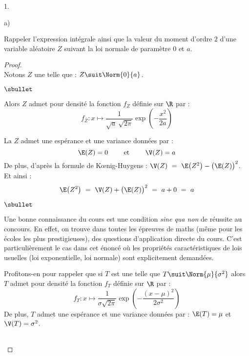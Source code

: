 \documentclass[11pt]{article}%
\begin{document}
\begin{noliste}{1.}
\begin{noliste}{a)}
  \item Rappeler l'expression intégrale ainsi que la valeur du moment
    d'ordre $2$ d'une variable aléatoire $Z$ suivant la loi normale de
    paramètre $0$ et $a$.

    \begin{proof}~\\%
      Notons $Z$ une \var telle que : $Z \suit \Norm{0}{a}$.
      \begin{noliste}{$\sbullet$}
      \item Alors $Z$ admet pour densité la fonction $f_Z$ définie sur
        $\R$ par : 
        \[
        f_Z : x \mapsto \dfrac{1}{\sqrt{a} \ \sqrt{2\pi}}
        \exp\left(-\dfrac{x^2}{2a} \right)
        \]

      \item La \var $Z$ admet une espérance et une variance données
        par :
        \[
        \E(Z) = 0 \qquad \text{ et } \qquad \V(Z) = a
        \]
        De plus, d'après la formule de K\oe{}nig-Huygens : $\V(Z) \ =
        \ \E\big( Z^2 \big) - \big( \E(Z) \big)^2$. Et ainsi :
        \[
        \E\big( Z^2 \big) \ = \ \V(Z) + \big( \E(Z) \big)^2 \ = \ a +
        0 \ = \ a
        \]
      \end{noliste}
    \begin{remarkL}{.97}%
      \begin{noliste}{$\sbullet$}
      \item Une bonne connaissance du cours est une condition {\it
          sine qua non} de réussite au concours. En effet, on trouve
        dans toutes les épreuves de maths (même pour les écoles les
        plus prestigieuses), des questions d'application directe du
        cours. C'est particulièrement le cas dans cet énoncé où les
        propriétés caractéristiques de lois usuelles (loi
        exponentielle, loi normale) sont explicitement demandées.
      \item Profitons-en pour rappeler que si $T$ est une \var telle
        que $T \suit \Norm{\mu}{\sigma^2}$ alors $T$ admet pour
        densité la fonction $f_T$ définie sur $\R$ par :
        \[
        f_T : x \mapsto \dfrac{1}{\sigma\sqrt{2\pi}}
        \exp\left(-\dfrac{(x-\mu)^2}{2\sigma^2} \right)
        \]
        De plus, $T$ admet une espérance et une variance données par :
        $\E(T) = \mu$ et $\V(T) = \sigma^2$.
      \end{noliste}
    \end{remarkL}~\\[-1.4cm]
    \end{proof}


\end{noliste}
\end{noliste}
\end{document}
